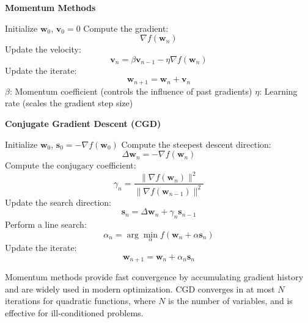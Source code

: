 \documentclass[11pt]{article}
\numberwithin{equation}{section}
\begin{document}
\vspace{0.5em}

\noindent
\begin{minipage}[t]{0.45\textwidth}
    \textbf{Momentum Methods}\\
    \begin{algorithmic}[1]
        \State Initialize $\mathbf{w}_0$, $\mathbf{v}_0 = 0$
            \State Compute the gradient:
            \[
            \nabla f(\mathbf{w}_n)
            \]
            \State Update the velocity:
            \[
            \mathbf{v}_n = \beta \mathbf{v}_{n-1} - \eta \nabla f(\mathbf{w}_n)
            \]
            \State Update the iterate:
            \[
            \mathbf{w}_{n+1} = \mathbf{w}_n + \mathbf{v}_n
            \]
        \EndFor
        \State \(\beta\): Momentum coefficient (controls the influence of past gradients)
        \State \(\eta\): Learning rate (scales the gradient step size)
    \end{algorithmic}
\end{minipage}
\hfill
\begin{minipage}[t]{0.45\textwidth}
    \textbf{Conjugate Gradient Descent (CGD)}\\
    \begin{algorithmic}[1]
        \State Initialize $\mathbf{w}_0$, $\mathbf{s}_0 = -\nabla f(\mathbf{w}_0)$
            \State Compute the steepest descent direction:
            \[
            \Delta \mathbf{w}_n = -\nabla f(\mathbf{w}_n)
            \]
            \State Compute the conjugacy coefficient:
            \[
            \gamma_n = \frac{\|\nabla f(\mathbf{w}_n)\|^2}{\|\nabla f(\mathbf{w}_{n-1})\|^2}
            \]
            \State Update the search direction:
            \[
            \mathbf{s}_n = \Delta \mathbf{w}_n + \gamma_n \mathbf{s}_{n-1}
            \]
            \State Perform a line search:
            \[
            \alpha_n = \arg \min_\alpha f(\mathbf{w}_n + \alpha \mathbf{s}_n)
            \]
            \State Update the iterate:
            \[
            \mathbf{w}_{n+1} = \mathbf{w}_n + \alpha_n \mathbf{s}_n
            \]
        \EndFor
    \end{algorithmic}
\end{minipage}

\vspace{0.5em}

Momentum methods provide fast convergence by accumulating gradient history and are widely used in modern optimization. CGD converges in at most \(N\) iterations for quadratic functions, where \(N\) is the number of variables, and is effective for ill-conditioned problems.
\end{document}
